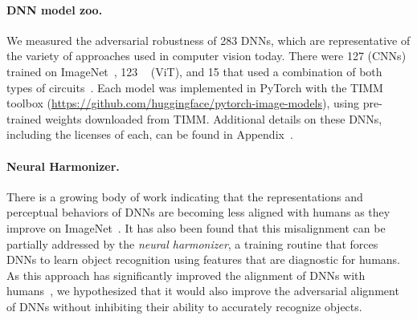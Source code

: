 \documentclass{article}
\theoremstyle{plain}
\theoremstyle{definition}
\theoremstyle{remark}
\begin{document}
\paragraph{DNN model zoo.}
We measured the adversarial robustness of 283 DNNs, which are representative of the variety of approaches used in computer vision today. There were 127 {\color{CNN}{convolutional neural networks}} (CNNs) trained on ImageNet~\cite{Chen2021-is,Tan2019-uh,Radosavovic2020-cs,Howard2019-cr,Simonyan2014-jd,Huang2018-yt,He2015-lm,Zhang2020-my,Gao2021-er,Kolesnikov2019-gg,Sandler2018-lh,Liu2022-es,Szegedy2016-fd,Szegedy2015-pr,Chollet2016-np,Radford2021-km,Xie2019-ju,Xie2016-ol,Szegedy2015-pr,Brendel2019-mw,Mehta2020-ad,Chen2017-wp,Wang2019-jm,Tan2018-zk, Xie2019-rp,Radford2021-km,Liu2022-es}, 123 {\color{transformer}{vision transformers}}~\cite{Dehghani2023-zw,Dosovitskiy2021-zy,Touvron2020-fo,El-Nouby2021-iw,Liu2021-cv,Liu2021-sj,Mehta2021-dd,Tu2022-br,Fang2023-yq,Fang2022-sx,Touvron2021-zu} (ViT), and 15 {\color{hybrid}{CNN/ViT hybrid architectures}} that used a combination of both types of circuits~\cite{Xu2021-oy,Yuan2021-vh}. Each model was implemented in PyTorch with the TIMM toolbox (\url{https://github.com/huggingface/pytorch-image-models}), using pre-trained weights downloaded from TIMM. Additional details on these DNNs, including the licenses of each, can be found in Appendix~.

\paragraph{Neural Harmonizer.} There is a growing body of work indicating that the representations and perceptual behaviors of DNNs are becoming less aligned with humans as they improve on ImageNet~\cite{Fel2022-dt,Kumar2022-lv,Bowers2022-cy}. It has also been found that this misalignment can be partially addressed by the \emph{neural harmonizer}, a training routine that forces DNNs to learn object recognition using features that are diagnostic for humans. As this approach has significantly improved the alignment of DNNs with humans~\cite{Fel2022-dt}, we hypothesized that it would also improve the adversarial alignment of DNNs without inhibiting their ability to accurately recognize objects.
\end{document}

